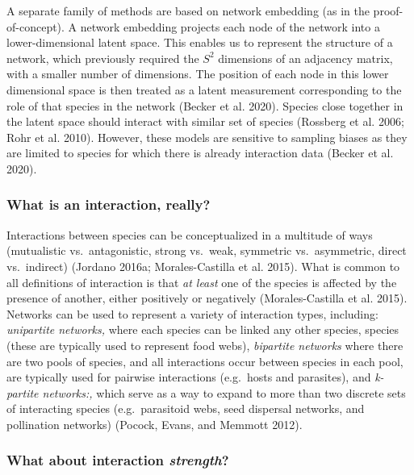 \documentclass[10pt,oneside]{article}
\begin{document}
A separate family of methods are based on network embedding (as in the
proof-of-concept). A network embedding projects each node of the network
into a lower-dimensional latent space. This enables us to represent the
structure of a network, which previously required the \(S^2\) dimensions
of an adjacency matrix, with a smaller number of dimensions. The
position of each node in this lower dimensional space is then treated as
a latent measurement corresponding to the role of that species in the
network (Becker et al. 2020). Species close together in the latent space
should interact with similar set of species (Rossberg et al. 2006; Rohr
et al. 2010). However, these models are sensitive to sampling biases as
they are limited to species for which there is already interaction data
(Becker et al. 2020).

\hypertarget{what-is-an-interaction-really}{%
\subsubsection{What is an interaction,
really?}\label{what-is-an-interaction-really}}

Interactions between species can be conceptualized in a multitude of
ways (mutualistic vs.~antagonistic, strong vs.~weak, symmetric
vs.~asymmetric, direct vs.~indirect) (Jordano 2016a; Morales-Castilla et
al. 2015). What is common to all definitions of interaction is that
\emph{at least} one of the species is affected by the presence of
another, either positively or negatively (Morales-Castilla et al. 2015).
Networks can be used to represent a variety of interaction types,
including: \emph{unipartite networks,} where each species can be linked
any other species, species (these are typically used to represent food
webs), \emph{bipartite networks} where there are two pools of species,
and all interactions occur between species in each pool, are typically
used for pairwise interactions (e.g.~hosts and parasites), and
\emph{k-partite networks:,} which serve as a way to expand to more than
two discrete sets of interacting species (e.g.~parasitoid webs, seed
dispersal networks, and pollination networks) (Pocock, Evans, and
Memmott 2012).

\hypertarget{what-about-interaction-strength}{%
\subsubsection{\texorpdfstring{What about interaction
\emph{strength}?}{What about interaction strength?}}\label{what-about-interaction-strength}}
\end{document}
